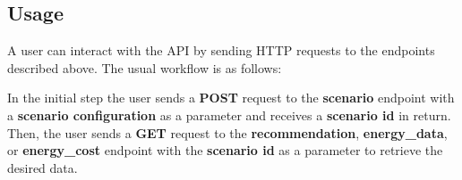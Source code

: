 \subsection{Usage}

A user can interact with the API by sending HTTP requests to the endpoints described above.
The usual workflow is as follows:

In the initial step the user sends a \textbf{POST} request to the \textbf{scenario} endpoint with a \textbf{scenario configuration} as a parameter
and receives a \textbf{scenario id} in return.
Then, the user sends a \textbf{GET} request to the \textbf{recommendation}, \textbf{energy\_data}, or \textbf{energy\_cost} endpoint with the \textbf{scenario id} as a parameter
to retrieve the desired data.